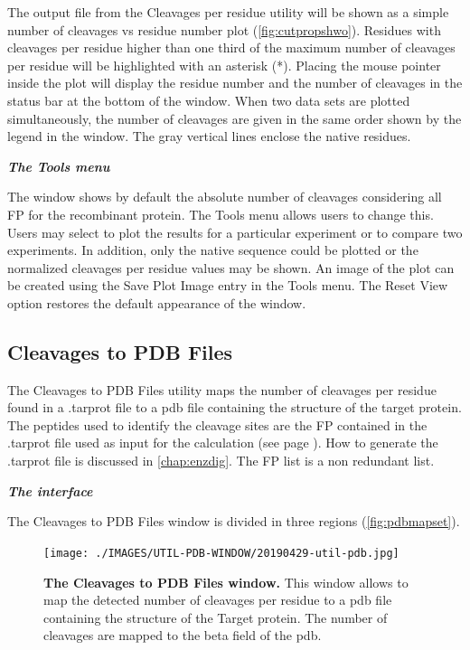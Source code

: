 The output file from the Cleavages per residue utility will be shown as a simple number of cleavages vs residue number plot (\autoref{fig:cutpropshwo}). Residues with cleavages per residue higher than one third of the maximum number of cleavages per residue will be highlighted with an asterisk (*). Placing the mouse pointer inside the plot will display the residue number and the number of cleavages in the status bar at the bottom of the window. When two data sets are plotted simultaneously, the number of cleavages are given in the same order shown by the legend in the window. The gray vertical lines enclose the native residues. 

\textit{\textbf{The Tools menu}}

The window shows by default the absolute number of cleavages considering all FP for the recombinant protein. The Tools menu allows users to change this. Users may select to plot the results for a particular experiment or to compare two experiments. In addition, only the native sequence could be plotted or the normalized cleavages per residue values may be shown. An image of the plot can be created using the Save Plot Image entry in the Tools menu. The Reset View option restores the default appearance of the window.   

\subsection{Cleavages to PDB Files}
\label{subsec:cut2pdb}

The Cleavages to PDB Files utility maps the number of cleavages per residue found in a .tarprot file to a pdb file containing the structure of the target protein. The peptides used to identify the cleavage sites are the FP contained in the .tarprot file used as input for the calculation (see page \pageref{par:PIP}). How to generate the .tarprot file is discussed in \autoref{chap:enzdig}. The FP list is a non redundant list.

\textit{\textbf{The interface}}

The Cleavages to PDB Files window is divided in three regions (\autoref{fig:pdbmapset}).

\begin{figure}[h]
	\centering
	\texttt{[image: ./IMAGES/UTIL-PDB-WINDOW/20190429-util-pdb.jpg]}	    
	\caption[The Cleavages to PDB Files window]{\textbf{The Cleavages to PDB Files window.} This window allows to map the detected number of cleavages per residue to a pdb file containing the structure of the Target protein. The number of cleavages are mapped to the beta field of the pdb. } 
	\label{fig:pdbmapset}
	\vspace{-5pt} 	
\end{figure}

